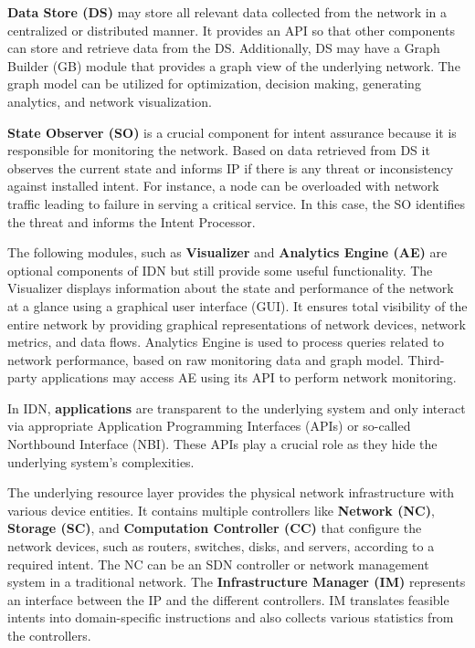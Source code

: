 \textbf{Data Store (DS)} may store all relevant data collected from the network in a centralized or distributed manner. It provides an API so that other components can store and retrieve data from the DS. Additionally, DS may have a Graph Builder (GB) module that provides a graph view of the underlying network. The graph model can be utilized for optimization, decision making, generating analytics, and network visualization.

\textbf{State Observer (SO)} is a crucial component for intent assurance because it is responsible for monitoring the network. Based on data retrieved from DS it observes the current state and informs IP if there is any threat or inconsistency against installed intent. For instance, a node can be overloaded with network traffic leading to failure in serving a critical service. In this case, the SO identifies the threat and informs the Intent Processor.

The following modules, such as \textbf{Visualizer} and \textbf{Analytics Engine (AE)} are optional components of IDN but still provide some useful functionality. The Visualizer displays information about the state and performance of the network at a glance using a graphical user interface (GUI). It ensures total visibility of the entire network by providing graphical representations of network devices, network metrics, and data flows. Analytics Engine is used to process queries related to network performance, based on raw monitoring data and graph model. Third-party applications may access AE using its API to perform network monitoring.

In IDN, \textbf{applications} are transparent to the underlying system and only interact via appropriate Application Programming Interfaces (APIs) or so-called Northbound Interface (NBI). These APIs play a crucial role as they hide the underlying system's complexities.

The underlying resource layer provides the physical network infrastructure with various device entities. It contains multiple controllers like \textbf{Network (NC)}, \textbf{Storage (SC)}, and \textbf{Computation Controller (CC)} that configure the network devices, such as routers, switches, disks, and servers, according to a required intent. The NC can be an SDN controller or network management system in a traditional network. The \textbf{Infrastructure Manager (IM)} represents an interface between the IP and the different controllers. IM translates feasible intents into domain-specific instructions and also collects various statistics from the controllers.

